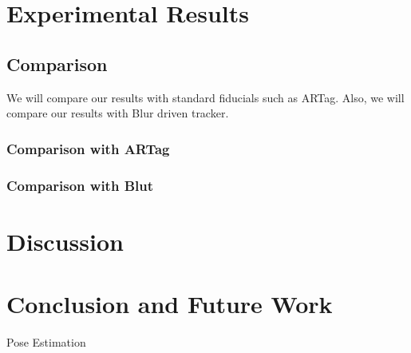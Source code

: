 \documentclass[runningheads]{llncs}
\begin{document}
\section{Experimental Results}
\subsection{Comparison}
We will compare our results with standard fiducials such as ARTag. Also, we will
compare our results with Blur driven tracker.
\subsubsection{Comparison with ARTag}
\subsubsection{Comparison with Blut} 

\section{Discussion}

\section{Conclusion and Future Work}

Pose Estimation



\end{document}
